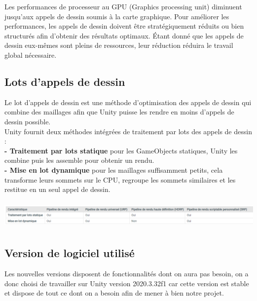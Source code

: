 Les performances de processeur au GPU (Graphics processing unit) diminuent jusqu’aux appels de dessin soumis à la carte graphique. Pour améliorer les performances, les appels de dessin doivent être stratégiquement réduits ou bien structurés afin d’obtenir des résultats optimaux. Étant donné que les appels de dessin eux-mêmes sont pleins de ressources, leur réduction réduira le travail global nécessaire. 

\subsection{\textbf{Lots d'appels de dessin}}

Le lot d'appels de dessin \cite{dessin} est une méthode d'optimisation des appels de dessin qui combine des maillages afin que Unity puisse les rendre en moins d'appels de dessin possible. \\

Unity fournit deux méthodes intégrées de traitement par lots des appels de dessin :\\

\textbf{- Traitement par lots statique} pour les GameObjects statiques, Unity les combine puis les assemble pour obtenir un rendu.\\

\textbf{- Mise en lot dynamique} pour les maillages suffisamment petits, cela transforme leurs sommets sur le CPU, regroupe les sommets similaires et les restitue en un seul appel de dessin.

\begin{center}
\includegraphics[height = 1.5cm]{images/pipeline.png}\\
\end{center}

\subsection{\textbf{Version de logiciel utilisé}}

Les nouvelles versions \cite{version} disposent de fonctionnalités dont on aura pas besoin, on a donc choisi de travailler sur Unity version 2020.3.32f1 car cette version est stable et dispose de tout ce dont on a besoin afin de mener à bien notre projet.